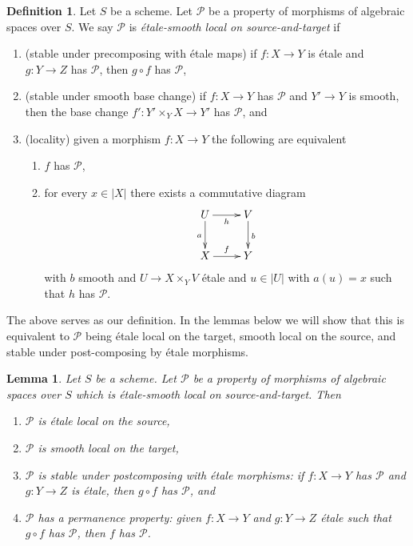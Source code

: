 \documentclass{stacks-project}
\theoremstyle{plain}
\newtheorem{lemma}[subsection]{Lemma}
\theoremstyle{definition}
\newtheorem{definition}[subsection]{Definition}
\theoremstyle{remark}
\numberwithin{equation}{subsection}
\begin{document}
\begin{definition}
\label{definition-etale-smooth-local-source-target}
Let $S$ be a scheme.
Let $\mathcal{P}$ be a property of morphisms of algebraic spaces over $S$.
We say $\mathcal{P}$ is {\it \'etale-smooth local on source-and-target} if
\begin{enumerate}
\item (stable under precomposing with \'etale maps)
if $f : X \to Y$ is \'etale and $g : Y \to Z$ has $\mathcal{P}$,
then $g \circ f$ has $\mathcal{P}$,
\item (stable under smooth base change)
if $f : X \to Y$ has $\mathcal{P}$ and $Y' \to Y$ is smooth, then
the base change $f' : Y' \times_Y X \to Y'$ has $\mathcal{P}$, and
\item (locality) given a morphism $f : X \to Y$ the following are
equivalent
\begin{enumerate}
\item $f$ has $\mathcal{P}$,
\item for every $x \in |X|$ there exists a commutative diagram
$$
\xymatrix{
U \ar[d]_a \ar[r]_h & V \ar[d]^b \\
X \ar[r]^f & Y
}
$$
with $b$ smooth and $U \to X \times_Y V$ \'etale
and $u \in |U|$ with $a(u) = x$ such that
$h$ has $\mathcal{P}$.
\end{enumerate}
\end{enumerate}
\end{definition}

\noindent
The above serves as our definition. In the lemmas below we will show that
this is equivalent to $\mathcal{P}$ being \'etale local on the target,
smooth local on the source, and stable under post-composing by
\'etale morphisms.

\begin{lemma}
\label{lemma-etale-smooth-local-source-target-implies}
Let $S$ be a scheme.
Let $\mathcal{P}$ be a property of morphisms of algebraic spaces over $S$
which is \'etale-smooth local on source-and-target. Then
\begin{enumerate}
\item $\mathcal{P}$ is \'etale local on the source,
\item $\mathcal{P}$ is smooth local on the target,
\item $\mathcal{P}$ is stable under postcomposing with \'etale morphisms:
if $f : X \to Y$ has $\mathcal{P}$ and $g : Y \to Z$ is \'etale, then
$g \circ f$ has $\mathcal{P}$, and
\item $\mathcal{P}$ has a permanence property: given $f : X \to Y$ and
$g : Y \to Z$ \'etale such that $g \circ f$ has $\mathcal{P}$, then
$f$ has $\mathcal{P}$.
\end{enumerate}
\end{lemma}
\end{document}

